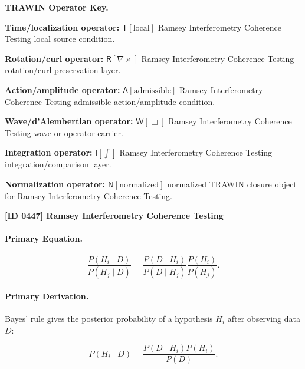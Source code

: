 \par\vspace{0.45\baselineskip}
\noindent\begin{minipage}[t]{\linewidth}
\begingroup
\small
\raggedright
\textbf{TRAWIN Operator Key.}\par
\noindent\textbf{Time/localization operator:} $\mathsf{T}\!\left[\mathrm{local}\right]$ Ramsey Interferometry Coherence Testing local source condition.\par
\noindent\textbf{Rotation/curl operator:} $\mathsf{R}\!\left[\nabla\times\right]$ Ramsey Interferometry Coherence Testing rotation/curl preservation layer.\par
\noindent\textbf{Action/amplitude operator:} $\mathsf{A}\!\left[\mathrm{admissible}\right]$ Ramsey Interferometry Coherence Testing admissible action/amplitude condition.\par
\noindent\textbf{Wave/d'Alembertian operator:} $\mathsf{W}\!\left[\Box\right]$ Ramsey Interferometry Coherence Testing wave or operator carrier.\par
\noindent\textbf{Integration operator:} $\mathsf{I}\!\left[\int\right]$ Ramsey Interferometry Coherence Testing integration/comparison layer.\par
\noindent\textbf{Normalization operator:} $\mathsf{N}\!\left[\mathrm{normalized}\right]$ normalized TRAWIN closure object for Ramsey Interferometry Coherence Testing.\par
\endgroup
\end{minipage}

\clearpage
\noindent\textbf{[ID 0447] Ramsey Interferometry Coherence Testing}\par
\vspace{0.35em}
\paragraph{Primary Equation.}
\begin{equation}
\frac{P(H_i\mid D)}
{P(H_j\mid D)}
=
\frac{P(D\mid H_i)}
{P(D\mid H_j)}
\frac{P(H_i)}
{P(H_j)} .
\end{equation}

\paragraph{Primary Derivation.}
Bayes' rule gives the posterior probability of a hypothesis $H_i$ after observing data $D$:

\begin{equation}
P(H_i\mid D)
=
\frac{P(D\mid H_i)P(H_i)}
{P(D)} .
\end{equation}

